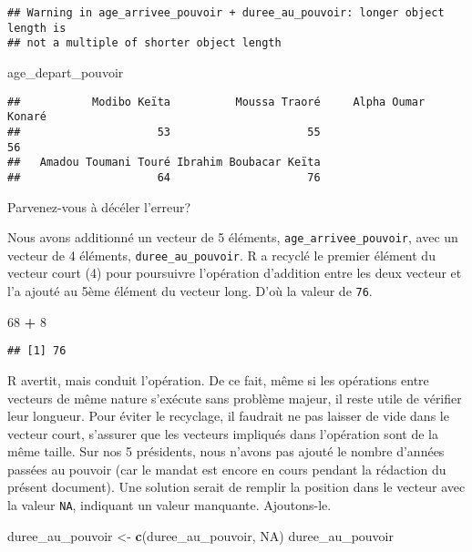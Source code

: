 \documentclass[]{book}
\newenvironment{Shaded}{\begin{snugshade}}{\end{snugshade}}
\newcommand{\KeywordTok}[1]{\textcolor[rgb]{0.13,0.29,0.53}{\textbf{#1}}}
\newcommand{\DecValTok}[1]{\textcolor[rgb]{0.00,0.00,0.81}{#1}}
\newcommand{\StringTok}[1]{\textcolor[rgb]{0.31,0.60,0.02}{#1}}
\newcommand{\OtherTok}[1]{\textcolor[rgb]{0.56,0.35,0.01}{#1}}
\newcommand{\OperatorTok}[1]{\textcolor[rgb]{0.81,0.36,0.00}{\textbf{#1}}}
\newcommand{\NormalTok}[1]{#1}
\begin{document}
\begin{verbatim}
## Warning in age_arrivee_pouvoir + duree_au_pouvoir: longer object length is
## not a multiple of shorter object length
\end{verbatim}

\begin{Shaded}
\begin{Highlighting}[]
\NormalTok{age_depart_pouvoir}
\end{Highlighting}
\end{Shaded}

\begin{verbatim}
##           Modibo Keïta          Moussa Traoré     Alpha Oumar Konaré 
##                     53                     55                     56 
##   Amadou Toumani Touré Ibrahim Boubacar Keïta 
##                     64                     76
\end{verbatim}

Parvenez-vous à décéler l'erreur?

Nous avons additionné un vecteur de 5 éléments,
\texttt{age\_arrivee\_pouvoir}, avec un vecteur de 4 éléments,
\texttt{duree\_au\_pouvoir}. R a recyclé le premier élément du vecteur
court (4) pour poursuivre l'opération d'addition entre les deux vecteur
et l'a ajouté au 5ème élément du vecteur long. D'où la valeur de
\texttt{76}.

\begin{Shaded}
\begin{Highlighting}[]
\DecValTok{68} \OperatorTok{+}\StringTok{ }\DecValTok{8}
\end{Highlighting}
\end{Shaded}

\begin{verbatim}
## [1] 76
\end{verbatim}

R avertit, mais conduit l'opération. De ce fait, même si les opérations
entre vecteurs de même nature s'exécute sans problème majeur, il reste
utile de vérifier leur longueur. Pour éviter le recyclage, il faudrait
ne pas laisser de vide dans le vecteur court, s'assurer que les vecteurs
impliqués dans l'opération sont de la même taille. Sur nos 5 présidents,
nous n'avons pas ajouté le nombre d'années passées au pouvoir (car le
mandat est encore en cours pendant la rédaction du présent document).
Une solution serait de remplir la position dans le vecteur avec la
valeur \texttt{NA}, indiquant un valeur manquante. Ajoutons-le.

\begin{Shaded}
\begin{Highlighting}[]
\NormalTok{duree_au_pouvoir <-}\StringTok{ }\KeywordTok{c}\NormalTok{(duree_au_pouvoir, }\OtherTok{NA}\NormalTok{)}
\NormalTok{duree_au_pouvoir}
\end{Highlighting}
\end{Shaded}
\end{document}
